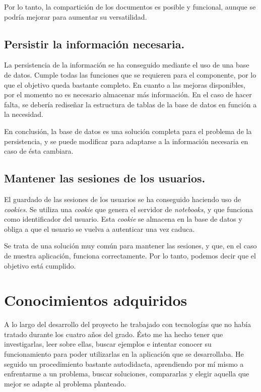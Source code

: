 \documentclass[11pt,spanish,listoffigures]{tfgetsinf}
\begin{document}
Por lo tanto, la compartición de los documentos es posible y funcional, aunque se podría mejorar para aumentar su versatilidad.

\subsection{Persistir la información necesaria.}
\label{subsec:objetivos-conc-persistir}

La persistencia de la información se ha conseguido mediante el uso de una base de datos. Cumple todas las funciones que se requieren para el componente, por lo que el objetivo queda bastante completo. En cuanto a las mejoras disponibles, por el momento no es necesario almacenar más información. En el caso de hacer falta, se debería rediseñar la estructura de tablas de la base de datos en función a la necesidad. 

En conclusión, la base de datos es una solución completa para el problema de la persistencia, y se puede modificar para adaptarse a la información necesaria en caso de ésta cambiara.

\subsection{Mantener las sesiones de los usuarios.}
\label{subsec:objetivos-conc-session}

El guardado de las sesiones de los usuarios se ha conseguido haciendo uso de \textit{cookies}. Se utiliza una \textit{cookie} que genera el servidor de \textit{notebooks}, y que funciona como identificador del usuario. Esta \textit{cookie} se almacena en la base de datos y obliga a que el usuario se vuelva a autenticar una vez caduca.

Se trata de una solución muy común para mantener las sesiones, y que, en el caso de nuestra aplicación, funciona correctamente. Por lo tanto, podemos decir que el objetivo está cumplido.



\section{Conocimientos adquiridos}
\label{sec:conocimientos-adquiridos}

A lo largo del desarrollo del proyecto he trabajado con tecnologías que no había tratado durante los cuatro años del grado. Ésto me ha hecho tener que investigarlas, leer sobre ellas, buscar ejemplos e intentar conocer su funcionamiento para poder utilizarlas en la aplicación que se desarrollaba. He seguido un procedimiento bastante autodidacta, aprendiendo por mí mismo a enfrentarme a un problema, buscar soluciones, compararlas y elegir aquella que mejor se adapte al problema planteado.
\end{document}
